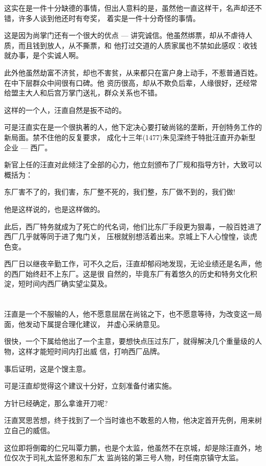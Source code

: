 \documentclass[11pt,a4paper,onecolumn]{article}
\begin{document}
这实在是一件十分缺德的事情，但出人意料的是，虽然他一直这样干，名声却还不错，许多人谈到他还时有夸奖，
着实是一件十分奇怪的事情。

这是因为尚掌门还有一个很大的优点 --- 讲究诚信。他虽然绑票，却从不虐待人质，而且钱到放人，从不撕票，和
他打过交道的人质家属也不禁如此感叹：收钱就办事，是个实诚人啊。

此外他虽然劫富不济贫，却也不害贫，从来都只在富户身上动手，不惹普通百姓。在中下层群众中间很有口碑。他
资历很高，却从不欺负后辈，人缘很好，还经常给盟主大人和后宫万掌门送礼，群众关系也不错。

这样的一个人，汪直自然是扳不动的。

可是汪直实在是一个很执著的人，他下定决心要打破尚铭的垄断，开创特务工作的新局面。禁不住他的反复要求，
成化十三年(1477)朱见深终于特批汪直开办新型企业 --- 西厂。

新官上任的汪直对此倾注了全部的心力，他立刻颁布了厂规和指导方针，大致可以概括为：

东厂害不了的，我们害，东厂整不死的，我们整，东厂做不到的，我们做!

他是这样说的，也是这样做的。

此后，西厂特务就成为了死亡的代名词，他们比东厂手段更为狠毒，一般百姓进了西厂几乎就等同于进了鬼门关，
压根就别想活着出来。京城上下人心惶惶，谈虎色变。

西厂日以继夜辛勤工作，可不久之后，汪直却郁闷地发现，无论业绩还是名声，他的西厂始终赶不上东厂。这是很
自然的，毕竟东厂有着悠久的历史和特务文化积淀，短时间内西厂确实望尘莫及。

\section[\thesection]{}

汪直是一个不服输的人，他不愿意屈居在尚铭之下，也不愿意等待，为改变这一局面，他发动下属提合理化建议，
并虚心采纳意见。

很快，一个下属给他出了一个主意，要想快点压过东厂，就得解决几个重量级的人物，这样才能短时间内打出威
信，打响西厂品牌。

事后证明，这是个馊主意。

可是汪直却觉得这个建议十分好，立刻准备付诸实施。

方针已经确定，那么拿谁开刀呢?

汪直冥思苦想，终于找到了一个当时谁也不敢惹的人物，他决定首开先例，用来树立自己的威信。

这位即将倒霉的仁兄叫覃力鹏，也是个太监，他虽然不在京城，却是除汪直外，地位仅次于司礼太监怀恩和东厂太
监尚铭的第三号人物，时任南京镇守太监。
\end{document}
